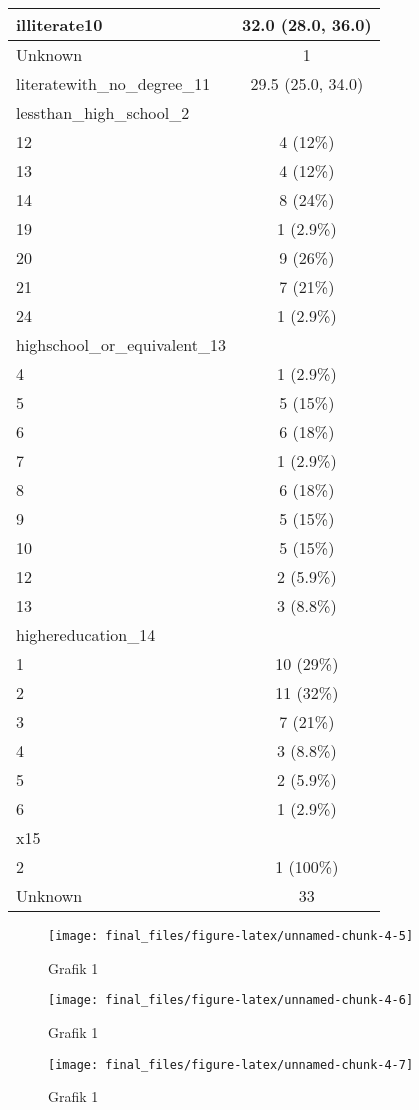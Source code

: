 \documentclass[
  12pt,
]{article}
\begin{document}
\begin{tabular}{l|c}
\hline
illiterate10 & 32.0 (28.0, 36.0)\\
\hline
Unknown & 1\\
\hline
literatewith\_no\_degree\_11 & 29.5 (25.0, 34.0)\\
\hline
lessthan\_high\_school\_2 & \\
\hline
12 & 4 (12\%)\\
\hline
13 & 4 (12\%)\\
\hline
14 & 8 (24\%)\\
\hline
19 & 1 (2.9\%)\\
\hline
20 & 9 (26\%)\\
\hline
21 & 7 (21\%)\\
\hline
24 & 1 (2.9\%)\\
\hline
highschool\_or\_equivalent\_13 & \\
\hline
4 & 1 (2.9\%)\\
\hline
5 & 5 (15\%)\\
\hline
6 & 6 (18\%)\\
\hline
7 & 1 (2.9\%)\\
\hline
8 & 6 (18\%)\\
\hline
9 & 5 (15\%)\\
\hline
10 & 5 (15\%)\\
\hline
12 & 2 (5.9\%)\\
\hline
13 & 3 (8.8\%)\\
\hline
highereducation\_14 & \\
\hline
1 & 10 (29\%)\\
\hline
2 & 11 (32\%)\\
\hline
3 & 7 (21\%)\\
\hline
4 & 3 (8.8\%)\\
\hline
5 & 2 (5.9\%)\\
\hline
6 & 1 (2.9\%)\\
\hline
x15 & \\
\hline
2 & 1 (100\%)\\
\hline
Unknown & 33\\
\hline
\end{tabular}

\begin{figure}

{\centering \texttt{[image: final\_files/figure-latex/unnamed-chunk-4-5]} 

}

\caption{Grafik 1}\label{fig:unnamed-chunk-4-5}
\end{figure}
\begin{figure}

{\centering \texttt{[image: final\_files/figure-latex/unnamed-chunk-4-6]} 

}

\caption{Grafik 1}\label{fig:unnamed-chunk-4-6}
\end{figure}
\begin{figure}

{\centering \texttt{[image: final\_files/figure-latex/unnamed-chunk-4-7]} 

}

\caption{Grafik 1}\label{fig:unnamed-chunk-4-7}
\end{figure}
\end{document}

